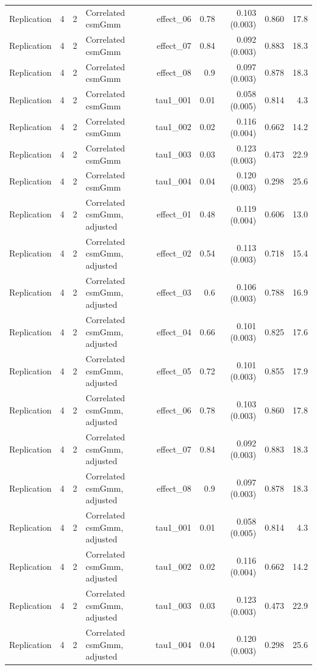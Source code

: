\begin{longtable}{lcclrrrrr}
Replication & 4 & 2 & Correlated csmGmm & effect\_06 & 0.78 & 0.103 (0.003) & 0.860 & 17.8\\
Replication & 4 & 2 & Correlated csmGmm & effect\_07 & 0.84 & 0.092 (0.003) & 0.883 & 18.3\\
Replication & 4 & 2 & Correlated csmGmm & effect\_08 & 0.9 & 0.097 (0.003) & 0.878 & 18.3\\
Replication & 4 & 2 & Correlated csmGmm & tau1\_001 & 0.01 & 0.058 (0.005) & 0.814 & 4.3\\
Replication & 4 & 2 & Correlated csmGmm & tau1\_002 & 0.02 & 0.116 (0.004) & 0.662 & 14.2\\
Replication & 4 & 2 & Correlated csmGmm & tau1\_003 & 0.03 & 0.123 (0.003) & 0.473 & 22.9\\
Replication & 4 & 2 & Correlated csmGmm & tau1\_004 & 0.04 & 0.120 (0.003) & 0.298 & 25.6\\
Replication & 4 & 2 & Correlated csmGmm, adjusted & effect\_01 & 0.48 & 0.119 (0.004) & 0.606 & 13.0\\
Replication & 4 & 2 & Correlated csmGmm, adjusted & effect\_02 & 0.54 & 0.113 (0.003) & 0.718 & 15.4\\
Replication & 4 & 2 & Correlated csmGmm, adjusted & effect\_03 & 0.6 & 0.106 (0.003) & 0.788 & 16.9\\
Replication & 4 & 2 & Correlated csmGmm, adjusted & effect\_04 & 0.66 & 0.101 (0.003) & 0.825 & 17.6\\
Replication & 4 & 2 & Correlated csmGmm, adjusted & effect\_05 & 0.72 & 0.101 (0.003) & 0.855 & 17.9\\
Replication & 4 & 2 & Correlated csmGmm, adjusted & effect\_06 & 0.78 & 0.103 (0.003) & 0.860 & 17.8\\
Replication & 4 & 2 & Correlated csmGmm, adjusted & effect\_07 & 0.84 & 0.092 (0.003) & 0.883 & 18.3\\
Replication & 4 & 2 & Correlated csmGmm, adjusted & effect\_08 & 0.9 & 0.097 (0.003) & 0.878 & 18.3\\
Replication & 4 & 2 & Correlated csmGmm, adjusted & tau1\_001 & 0.01 & 0.058 (0.005) & 0.814 & 4.3\\
Replication & 4 & 2 & Correlated csmGmm, adjusted & tau1\_002 & 0.02 & 0.116 (0.004) & 0.662 & 14.2\\
Replication & 4 & 2 & Correlated csmGmm, adjusted & tau1\_003 & 0.03 & 0.123 (0.003) & 0.473 & 22.9\\
Replication & 4 & 2 & Correlated csmGmm, adjusted & tau1\_004 & 0.04 & 0.120 (0.003) & 0.298 & 25.6\\

\end{longtable}
